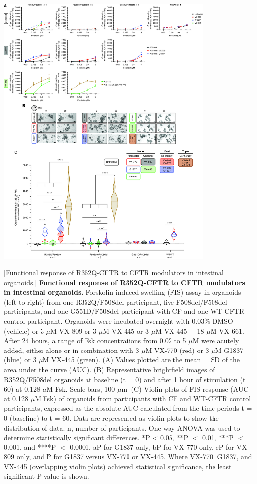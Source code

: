 	\begin{center}
		\includegraphics[width=0.80\textwidth]{figures/R352Q/figure_2.jpg}
	\label{R352_figure_1}
	\end{center}
	\begingroup
	[Functional response of R352Q-CFTR to CFTR modulators in intestinal organoids.] {\textbf{Functional response of R352Q-CFTR to CFTR modulators in intestinal organoids.}}{ Forskolin-induced swelling (FIS) assay in organoids (left to right) from one R352Q/F508del participant, five F508del/F508del participants, and one G551D/F508del participant with CF and one WT-CFTR control participant. Organoids were incubated overnight with 0.03\% DMSO (vehicle) or 3 $\mu$M VX-809 or 3 $\mu$M VX-445 or 3 $\mu$M VX-445 + 18 $\mu$M VX-661. After 24 hours, a range of Fsk concentrations from 0.02 to 5 $\mu$M were acutely added, either alone or in combination with 3 $\mu$M VX-770 (red) or 3 $\mu$M G1837 (blue) or 3 $\mu$M VX-445 (green). (A) Values plotted are the mean ± SD of the area under the curve (AUC). (B) Representative brightfield images of R352Q/F508del organoids at baseline (t = 0) and after 1 hour of stimulation (t = 60) at 0.128 $\mu$M Fsk. Scale bars, 100 $\mu$m. (C) Violin plots of FIS response (AUC at 0.128 $\mu$M Fsk) of organoids from participants with CF and WT-CFTR control participants, expressed as the absolute AUC calculated from the time periods t = 0 (baseline) to t = 60. Data are represented as violin plots to show the distribution of data. n, number of participants. One-way ANOVA was used to determine statistically significant differences. *P < 0.05, **P $<$ 0.01, ***P $<$ 0.001, and ****P $<$ 0.0001. aP for G1837 only, bP for VX-770 only, cP for VX-809 only, and \^P for G1837 versus VX-770 or VX-445. Where VX-770, G1837, and VX-445 (overlapping violin plots) achieved statistical significance, the least significant P value is shown.}
	\endgroup

